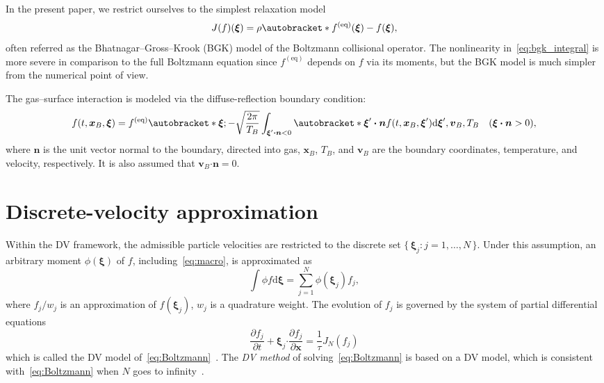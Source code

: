 \documentclass{elsarticle} %
\newcommand{\dd}{\mathrm{d}}
\newcommand{\pder}[2][]{\frac{\partial#1}{\partial#2}}
\newcommand{\Set}[2]{\{\,{#1}:{#2}\,\}}
\DeclarePairedDelimiter\autobracket()       %
\newcommand{\br}[1]{\autobracket*{#1}}
\newcommand{\dxi}{\dd{\boldsymbol{\xi}}}
\newcommand{\bxi}{\boldsymbol{\xi}}
\newcommand{\bv}{\boldsymbol{v}}
\newcommand{\bn}{\boldsymbol{n}}
\newcommand{\bdot}{\boldsymbol{\cdot}}
\newcommand{\bx}{\boldsymbol{x}}
\newcommand{\equil}[1]{#1^\mathrm{(eq)}}
\begin{document}
In the present paper, we restrict ourselves to the simplest relaxation model~\cite{Krook1954, Welander1954}
\begin{equation}\label{eq:bgk_integral}
    J(f)(\bxi) = \rho\br{\equil{f}(\bxi) - f(\bxi)},
\end{equation}
often referred as the Bhatnagar--Gross--Krook (BGK) model of the Boltzmann collisional operator.
The nonlinearity in~\eqref{eq:bgk_integral} is more severe in comparison to the full Boltzmann equation
since \(\equil{f}\) depends on \(f\) via its moments,
but the BGK model is much simpler from the numerical point of view.

The gas--surface interaction is modeled via the diffuse-reflection boundary condition:
\begin{equation}\label{eq:diffuse}
    f(t,\bx_B,\bxi) = \equil{f} \br{ \bxi;
        -\sqrt\frac{2\pi}{T_B} \int_{\bxi'\bdot\bn<0} \br{ \bxi'\bdot\bn } f(t,\bx_B,\bxi')\dxi', \bv_B, T_B
    } \quad (\bxi\bdot\bn>0),
\end{equation}
where \(\bn\) is the unit vector normal to the boundary, directed into gas,
\(\bx_B\), \(T_B\), and \(\bv_B\) are the boundary coordinates, temperature, and velocity, respectively.
It is also assumed that \(\bv_B\bdot\bn = 0\).

\section{Discrete-velocity approximation}\label{sec:dv}

Within the DV framework, the admissible particle velocities
are restricted to the discrete set \(\Set{\bxi_j}{j=1,\dots,N}\).
Under this assumption, an arbitrary moment \(\phi(\bxi)\) of \(f\), including~\eqref{eq:macro},
is approximated as
\begin{equation}\label{eq:cubature}
    \int \phi f\dxi = \sum_{j=1}^{N} \phi(\bxi_j) f_j,
\end{equation}
where \(f_j/w_j\) is an approximation of \(f(\bxi_j)\), \(w_j\) is a quadrature weight.
The evolution of \(f_j\) is governed by the system of partial differential equations
\begin{equation}\label{eq:dvm}
    \pder[f_j]{t} + \bxi_j\bdot\pder[f_j]{\bx} = \frac{1}{\tau} J_N(f_j)
\end{equation}
which is called the DV model of~\eqref{eq:Boltzmann}~\cite{Cabannes1980}.
The \emph{DV method} of solving~\eqref{eq:Boltzmann} is based on a DV model,
which is consistent with~\eqref{eq:Boltzmann} when \(N\) goes to infinity~\cite{Aristov2001}.
\end{document}
